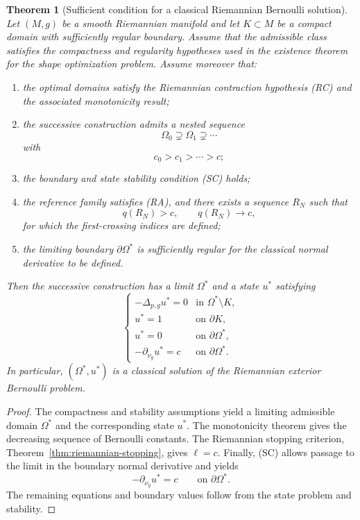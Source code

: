 \documentclass[11pt,a4paper]{article}
\newtheorem{theorem}{Theorem}[section]
\theoremstyle{definition}
\theoremstyle{remark}
\begin{document}
\begin{theorem}[Sufficient condition for a classical Riemannian Bernoulli solution]
\label{thm:final-riemannian-existence}
Let $(M,g)$ be a smooth Riemannian manifold and let $K\subset M$ be a
compact domain with sufficiently regular boundary. Assume that the
admissible class satisfies the compactness and regularity hypotheses
used in the existence theorem for the shape optimization problem.
Assume moreover that:

\begin{enumerate}[label={\rm (\roman*)}]
\item the optimal domains satisfy the Riemannian contraction
      hypothesis {\rm (RC)} and the associated monotonicity result;

\item the successive construction admits a nested sequence
      \[
      \Omega_0\supsetneq\Omega_1\supsetneq\cdots
      \]
      with
      \[
      c_0>c_1>\cdots>c;
      \]

\item the boundary and state stability condition {\rm (SC)} holds;

\item the reference family satisfies {\rm (RA)}, and there exists a
      sequence $R_N$ such that
      \[
      q(R_N)>c,\qquad q(R_N)\to c,
      \]
      for which the first-crossing indices are defined;

\item the limiting boundary $\partial\Omega^\ast$ is sufficiently
      regular for the classical normal derivative to be defined.
\end{enumerate}

Then the successive construction has a limit $\Omega^\ast$ and a
state $u^\ast$ satisfying
\[
\begin{cases}
-\Delta_{p,g}u^\ast=0
&\text{in }\Omega^\ast\setminus K,\\
u^\ast=1
&\text{on }\partial K,\\
u^\ast=0
&\text{on }\partial\Omega^\ast,\\
-\partial_{\nu_g}u^\ast=c
&\text{on }\partial\Omega^\ast.
\end{cases}
\]
In particular, $(\Omega^\ast,u^\ast)$ is a classical solution of the
Riemannian exterior Bernoulli problem.
\end{theorem}

\begin{proof}
The compactness and stability assumptions yield a limiting admissible
domain $\Omega^\ast$ and the corresponding state $u^\ast$. The
monotonicity theorem gives the decreasing sequence of Bernoulli
constants. The Riemannian stopping criterion,
Theorem~\ref{thm:riemannian-stopping}, gives $\ell=c$. Finally, (SC)
allows passage to the limit in the boundary normal derivative and
yields
\[
-\partial_{\nu_g}u^\ast=c
\qquad\text{on }\partial\Omega^\ast.
\]
The remaining equations and boundary values follow from the state
problem and stability.
\end{proof}
\end{document}
